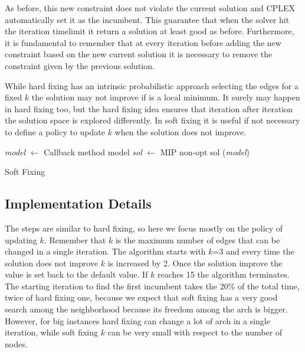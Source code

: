 As before, this new constraint does not violate the current solution and CPLEX
automatically set it as the incumbent. This guarantee that when the solver hit
the iteration timelimit it return a solution at least good as before.
Furthermore, it is fundamental to remember that at every iteration before
adding the new constraint based on the new current solution it is necessary to
remove the constraint given by the previous solution.

While hard fixing has an intrinsic probabilistic approach selecting the edges
for a fixed $k$ the solution may not improve if is a local minimum. It surely may
happen in hard fixing too, but the hard fixing idea ensures that iteration
after iteration the solution space is explored differently. In soft fixing it
is useful if not necessary to define a policy to update $k$ when the solution
does not improve.

\begin{algorithm}[H]
\SetAlgoLined
{}
    \emph{model} $\leftarrow$ Callback method model\;
    \emph{sol} $\leftarrow$ MIP non-opt sol (\emph{model})\;
    \caption{Soft Fixing}
\end{algorithm}

\subsection{Implementation Details}
The steps are similar to hard fixing, so here we focus mostly on the policy of
updating $k$. Remember that $k$ is the maximum number of edges that can be changed
in a single iteration. The algorithm starts with $k$=3 and every time the
solution does not improve $k$ is increased by 2. Once the solution improve the
value is set back to the default value. If $k$ reaches 15 the algorithm
terminates. The starting iteration to find the first incumbent takes the 20\%
of the total time, twice of hard fixing one, because we expect that soft fixing
has a very good search among the neighborhood because its freedom among the
arch is bigger. However, for big instances hard fixing can change a lot of arch
in a single iteration, while soft fixing $k$ can be very small with respect to
the number of nodes.

